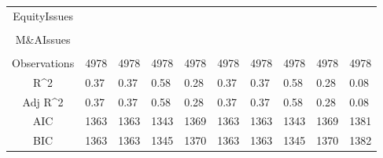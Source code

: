 \documentclass{article}
\begin{document}
\begin{table}[H]
\begin{tabular}{|clllllllll|}
  EquityIssues &  &  &  &  &  &  &  &  &  \\ 
   &  &  &  &  &  &  &  &  &  \\ 
  M\&AIssues &  &  &  &  &  &  &  &  &  \\ 
   &  &  &  &  &  &  &  &  &  \\ 
  \hline 
 Observations & 4978 & 4978 & 4978 & 4978 & 4978 & 4978 & 4978 & 4978 & 4978 \\ 
  R^2 & 0.37 & 0.37 & 0.58 & 0.28 & 0.37 & 0.37 & 0.58 & 0.28 & 0.08 \\ 
  Adj R^2 & 0.37 & 0.37 & 0.58 & 0.28 & 0.37 & 0.37 & 0.58 & 0.28 & 0.08 \\ 
  AIC & 1363 & 1363 & 1343 & 1369 & 1363 & 1363 & 1343 & 1369 & 1381 \\ 
  BIC & 1363 & 1363 & 1345 & 1370 & 1363 & 1363 & 1345 & 1370 & 1382 \\ 
   \hline
\end{tabular}
 
\end{table}
\end{document}

